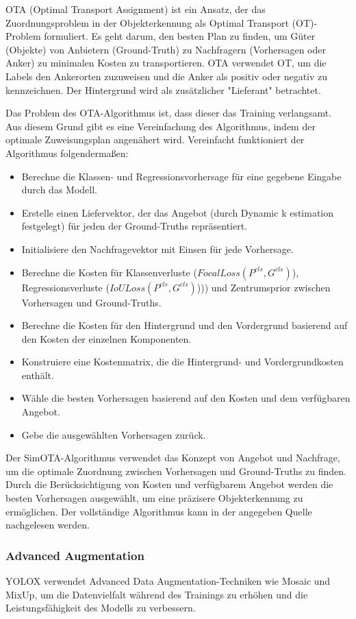 OTA (Optimal Transport Assignment) ist ein Ansatz, der das Zuordnungsproblem in der Objekterkennung als Optimal Transport (OT)-Problem formuliert. Es geht darum, den besten Plan zu finden, um Güter (Objekte) von Anbietern (Ground-Truth) zu Nachfragern (Vorhersagen oder Anker) zu minimalen Kosten zu transportieren. OTA verwendet OT, um die Labels den Ankerorten zuzuweisen und die Anker als positiv oder negativ zu kennzeichnen. Der Hintergrund wird als zusätzlicher "Lieferant" betrachtet. 

Das Problem des OTA-Algorithmus ist, dass dieser das Training verlangsamt. Aus diesem Grund gibt es eine Vereinfachung des Algorithmus, indem der optimale Zuweisungsplan angenähert wird. Vereinfacht funktioniert der Algorithmus folgendermaßen:
\begin{itemize}
	\item Berechne die Klassen- und Regressionsvorhersage für eine gegebene Eingabe durch das Modell.
	\item Erstelle einen Liefervektor, der das Angebot (durch Dynamic k estimation festgelegt) für jeden der Ground-Truths repräsentiert.
	\item Initialisiere den Nachfragevektor mit Einsen für jede Vorhersage.
	\item Berechne die Kosten für Klassenverluste ($FocalLoss(P^{cls}, G^{cls})$), Regressionsverluste ($IoULoss(P^{cls}, G^{cls})$))) und Zentrumsprior zwischen Vorhersagen und Ground-Truths.
	\item Berechne die Kosten für den Hintergrund und den Vordergrund basierend auf den Kosten der einzelnen Komponenten.
	\item Konstruiere eine Kostenmatrix, die die Hintergrund- und Vordergrundkosten enthält.
	\item Wähle die besten Vorhersagen basierend auf den Kosten und dem verfügbaren Angebot.
	\item Gebe die ausgewählten Vorhersagen zurück.
\end{itemize}

Der SimOTA-Algorithmus verwendet das Konzept von Angebot und Nachfrage, um die optimale Zuordnung zwischen Vorhersagen und Ground-Truths zu finden. Durch die Berücksichtigung von Kosten und verfügbarem Angebot werden die besten Vorhersagen ausgewählt, um eine präzisere Objekterkennung zu ermöglichen. Der vollständige Algorithmus kann in der angegeben Quelle nachgelesen werden.  \cite{yoloxExplanationSimOTA}


\subsubsection{Advanced Augmentation}
YOLOX verwendet Advanced Data Augmentation-Techniken wie Mosaic und MixUp, um die Datenvielfalt während des Trainings zu erhöhen und die Leistungsfähigkeit des Modells zu verbessern.

